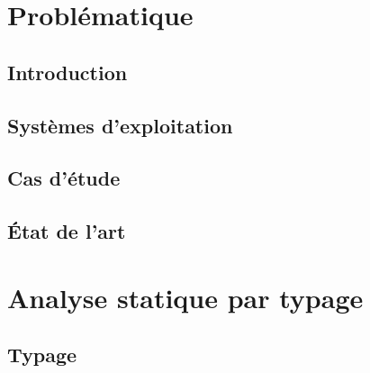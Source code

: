\documentclass[a4paper,11pt]{memoir}
\title{}
\author{Étienne Millon}
\begin{document}
\frontmatter

\maketitle

\cleartorecto






\tableofcontents

\mainmatter

\part{Problématique}

\chapter{Introduction}

\chapter{Systèmes d'exploitation}

\label{cha:os}


\chapter{Cas d'étude}



\chapter{État de l'art}



\part{Analyse statique par typage}

\chapter{Typage}


\end{document}
